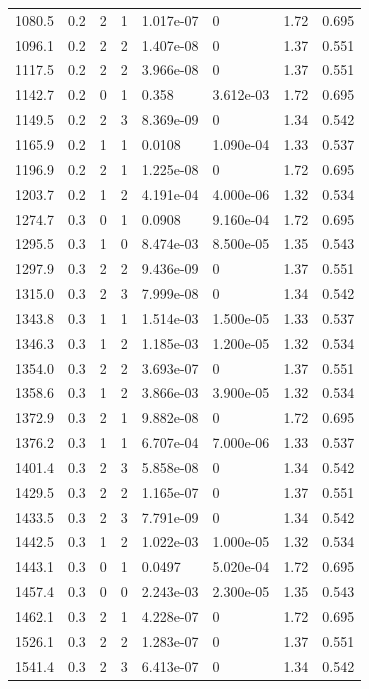\documentclass[preview]{standalone}
\begin{document}
{{{\begin{tabular}{L{1.2cm}C{1.2cm} C{0.3cm}C{0.5cm} C{1.4cm}C{1.4cm} C{1.4cm}C{1.4cm}}
  1080.5  &   0.2  & 2     &  1 &  1.017e-07  & 0  & 1.72 &  0.695   \\ 
  1096.1  &   0.2  & 2     &  2 &  1.407e-08  & 0  & 1.37 &  0.551   \\ 
  1117.5  &   0.2  & 2     &  2 &  3.966e-08  & 0  & 1.37 &  0.551   \\ 
  1142.7  &   0.2  & 0     &  1 &  0.358  & 3.612e-03  & 1.72 &  0.695   \\ 
  1149.5  &   0.2  & 2     &  3 &  8.369e-09  & 0  & 1.34 &  0.542   \\ 
  1165.9  &   0.2  & 1     &  1 &  0.0108  & 1.090e-04  & 1.33 &  0.537   \\ 
  1196.9  &   0.2  & 2     &  1 &  1.225e-08  & 0  & 1.72 &  0.695   \\ 
  1203.7  &   0.2  & 1     &  2 &  4.191e-04  & 4.000e-06  & 1.32 &  0.534   \\ 
  1274.7  &   0.3  & 0     &  1 &  0.0908  & 9.160e-04  & 1.72 &  0.695   \\ 
  1295.5  &   0.3  & 1     &  0 &  8.474e-03  & 8.500e-05  & 1.35 &  0.543   \\ 
  1297.9  &   0.3  & 2     &  2 &  9.436e-09  & 0  & 1.37 &  0.551   \\ 
  1315.0  &   0.3  & 2     &  3 &  7.999e-08  & 0  & 1.34 &  0.542   \\ 
  1343.8  &   0.3  & 1     &  1 &  1.514e-03  & 1.500e-05  & 1.33 &  0.537   \\ 
  1346.3  &   0.3  & 1     &  2 &  1.185e-03  & 1.200e-05  & 1.32 &  0.534   \\ 
  1354.0  &   0.3  & 2     &  2 &  3.693e-07  & 0  & 1.37 &  0.551   \\ 
  1358.6  &   0.3  & 1     &  2 &  3.866e-03  & 3.900e-05  & 1.32 &  0.534   \\ 
  1372.9  &   0.3  & 2     &  1 &  9.882e-08  & 0  & 1.72 &  0.695   \\ 
  1376.2  &   0.3  & 1     &  1 &  6.707e-04  & 7.000e-06  & 1.33 &  0.537   \\ 
  1401.4  &   0.3  & 2     &  3 &  5.858e-08  & 0  & 1.34 &  0.542   \\ 
  1429.5  &   0.3  & 2     &  2 &  1.165e-07  & 0  & 1.37 &  0.551   \\ 
  1433.5  &   0.3  & 2     &  3 &  7.791e-09  & 0  & 1.34 &  0.542   \\ 
  1442.5  &   0.3  & 1     &  2 &  1.022e-03  & 1.000e-05  & 1.32 &  0.534   \\ 
  1443.1  &   0.3  & 0     &  1 &  0.0497  & 5.020e-04  & 1.72 &  0.695   \\ 
  1457.4  &   0.3  & 0     &  0 &  2.243e-03  & 2.300e-05  & 1.35 &  0.543   \\ 
  1462.1  &   0.3  & 2     &  1 &  4.228e-07  & 0  & 1.72 &  0.695   \\ 
  1526.1  &   0.3  & 2     &  2 &  1.283e-07  & 0  & 1.37 &  0.551   \\ 
  1541.4  &   0.3  & 2     &  3 &  6.413e-07  & 0  & 1.34 &  0.542   \\ 
\hline 
\end{tabular} 

}}}
\end{document}
